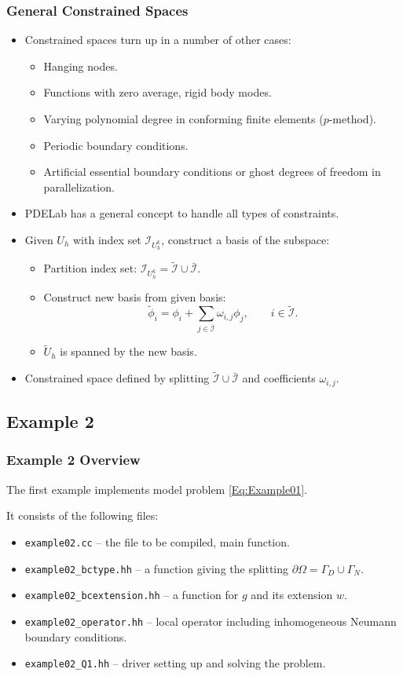 \begin{frame}
\frametitle{General Constrained Spaces}
\begin{itemize}
\item Constrained spaces turn up in a number of other cases:
\begin{itemize}
\item Hanging nodes.
\item Functions with zero average, rigid body modes.
\item Varying polynomial degree in conforming finite elements ($p$-method).
\item Periodic boundary conditions.
\item Artificial essential boundary conditions or ghost degrees of freedom in parallelization.
\end{itemize}
\item PDELab has a general concept to handle all types of constraints. 
\item Given $U_h$ with index set $\mathcal{I}_{U_h^k}$, construct a basis of the subspace:
\begin{itemize}
\item Partition index set: $\mathcal{I}_{U_h^k} = \tilde{\mathcal{I}} \cup \bar{\mathcal{I}}$.
\item Construct new basis from given basis:
\begin{equation*}
\tilde\phi_i = \phi_i + \sum\limits_{j\in\bar{\mathcal{I}}} \omega_{i,j} \phi_j, \qquad i\in\tilde{\mathcal{I}}.
\end{equation*}
\item $\tilde{U}_h$ is spanned by the new basis.
\end{itemize}
\item Constrained space defined by splitting $\tilde{\mathcal{I}} \cup \bar{\mathcal{I}}$ 
and coefficients $\omega_{i,j}$.
\end{itemize}
\end{frame}


\subsection{Example 2}

\begin{frame}
\frametitle{Example 2 Overview}
The first example implements model problem \eqref{Eq:Example01}.

It consists of the following files:
\begin{itemize}
\item \lstinline{example02.cc} -- the file to be compiled, main function. 
\item \lstinline{example02_bctype.hh} -- a function giving the splitting $\partial\Omega = \Gamma_D \cup \Gamma_N$.
\item \lstinline{example02_bcextension.hh} -- a function for $g$ and its extension $w$.
\item \lstinline{example02_operator.hh} -- local operator including inhomogeneous Neumann boundary conditions.
\item \lstinline{example02_Q1.hh} -- driver setting up and solving the problem. 
\end{itemize}
\end{frame}

